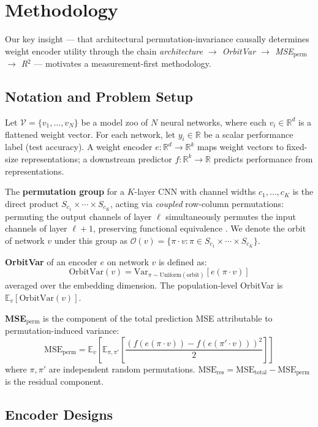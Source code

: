 \section{Methodology}
\label{sec:method}

Our key insight --- that architectural permutation-invariance causally determines weight encoder utility through the chain \emph{architecture $\to$ OrbitVar $\to$ MSE$_\text{perm}$ $\to$ R$^2$} --- motivates a measurement-first methodology.

\subsection{Notation and Problem Setup}

Let $\mathcal{V} = \{v_1, \ldots, v_N\}$ be a model zoo of $N$ neural networks, where each $v_i \in \mathbb{R}^d$ is a flattened weight vector. For each network, let $y_i \in \mathbb{R}$ be a scalar performance label (test accuracy). A weight encoder $e: \mathbb{R}^d \to \mathbb{R}^k$ maps weight vectors to fixed-size representations; a downstream predictor $f: \mathbb{R}^k \to \mathbb{R}$ predicts performance from representations.

The \textbf{permutation group} for a $K$-layer CNN with channel widths $c_1, \ldots, c_K$ is the direct product $S_{c_1} \times \cdots \times S_{c_K}$, acting via \emph{coupled} row-column permutations: permuting the output channels of layer $\ell$ simultaneously permutes the input channels of layer $\ell+1$, preserving functional equivalence \cite{Navon2023Equivariant}. We denote the orbit of network $v$ under this group as $\mathcal{O}(v) = \{\pi \cdot v : \pi \in S_{c_1} \times \cdots \times S_{c_K}\}$.

\textbf{OrbitVar} of an encoder $e$ on network $v$ is defined as:
\[
\text{OrbitVar}(v) = \text{Var}_{\pi \sim \text{Uniform}(\text{orbit})} \left[ e(\pi \cdot v) \right]
\]
averaged over the embedding dimension. The population-level OrbitVar is $\mathbb{E}_v[\text{OrbitVar}(v)]$.

\textbf{MSE$_\text{perm}$} is the component of the total prediction MSE attributable to permutation-induced variance:
\[
\text{MSE}_\text{perm} = \mathbb{E}_v \left[ \mathbb{E}_{\pi,\pi'} \left[ \frac{(f(e(\pi \cdot v)) - f(e(\pi' \cdot v)))^2}{2} \right] \right]
\]
where $\pi, \pi'$ are independent random permutations. $\text{MSE}_\text{res} = \text{MSE}_\text{total} - \text{MSE}_\text{perm}$ is the residual component.

\subsection{Encoder Designs}

